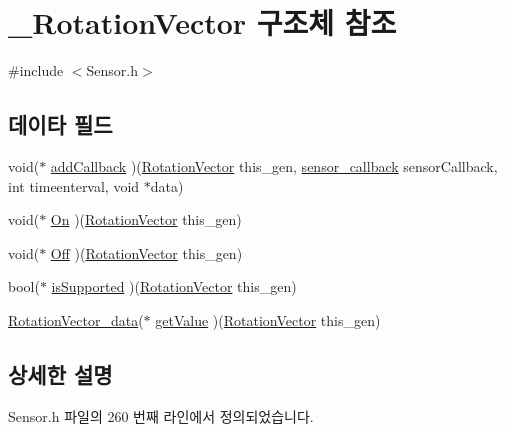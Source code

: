\hypertarget{struct___rotation_vector}{\section{\-\_\-\-Rotation\-Vector 구조체 참조}
\label{struct___rotation_vector}
}


{\ttfamily \#include $<$Sensor.\-h$>$}

\subsection*{데이타 필드}
\begin{DoxyCompactItemize}
\item 
void($\ast$ \hyperlink{struct___rotation_vector_ad472cb3e9a46a2c39e0e816eefedb549}{add\-Callback} )(\hyperlink{_sensor_8h_a9b05582479731d0c51a02be87c1f6b4a}{Rotation\-Vector} this\-\_\-gen, \hyperlink{_sensor_8h_ad8114207845fc5e0aa30832f0c718cd6}{sensor\-\_\-callback} sensor\-Callback, int timeenterval, void $\ast$data)
\item 
void($\ast$ \hyperlink{struct___rotation_vector_a4b696cbf05ce516ce608cb1ac70dbcc3}{On} )(\hyperlink{_sensor_8h_a9b05582479731d0c51a02be87c1f6b4a}{Rotation\-Vector} this\-\_\-gen)
\item 
void($\ast$ \hyperlink{struct___rotation_vector_ab4af77a4f32af8d4001b111cb630c1e6}{Off} )(\hyperlink{_sensor_8h_a9b05582479731d0c51a02be87c1f6b4a}{Rotation\-Vector} this\-\_\-gen)
\item 
bool($\ast$ \hyperlink{struct___rotation_vector_a6064cf9c8ed8eeb39afea3993119d471}{is\-Supported} )(\hyperlink{_sensor_8h_a9b05582479731d0c51a02be87c1f6b4a}{Rotation\-Vector} this\-\_\-gen)
\item 
\hyperlink{_sensor_8h_a544a9cbbdfd547167181ebc171137ad6}{Rotation\-Vector\-\_\-data}($\ast$ \hyperlink{struct___rotation_vector_ac37bd4354c04172e326f5c6f86580785}{get\-Value} )(\hyperlink{_sensor_8h_a9b05582479731d0c51a02be87c1f6b4a}{Rotation\-Vector} this\-\_\-gen)
\end{DoxyCompactItemize}


\subsection{상세한 설명}


Sensor.\-h 파일의 260 번째 라인에서 정의되었습니다.



